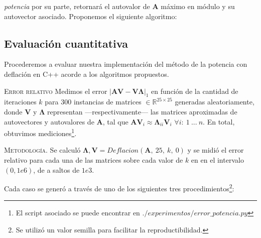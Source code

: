 \vspace{2em}
\noindent \textit{potencia} por su parte, retornará el autovalor de \textbf{A} máximo en módulo y su autovector asociado. Proponemos el siguiente algoritmo:

\vspace{1em}


\vspace{1em}






\vspace{2em}
\subsection{Evaluación cuantitativa} Procederemos a evaluar nuestra implementación del método de la potencia con deflación en C++ acorde a los algoritmos propuestos.

\vspace{1em}
\textsc{Error relativo} Medimos el error $|\mathbf{A} \mathbf{V} - \mathbf{V} \mathbf{\Lambda}|_1$ en función de la cantidad de iteraciones $k$ para 300 instancias de matrices $\in \mathbb{R}^{25 \times 25}$ generadas aleatoriamente, donde \textbf{V} y $\mathbf{\Lambda}$ representan ---respectivamente--- las matrices aproximadas de autovectores y autovalores de \textbf{A}, tal que $\mathbf{A}\mathbf{V}_i \approx \mathbf{\Lambda}_{ii} \mathbf{V}_i$ $\forall i:\ 1\ ...\ n$.  En total, obtuvimos  mediciones\footnote{El script asociado se puede encontrar en $./experimentos/error\_potencia.py$}.  


\vspace{1em}
\noindent \textsc{Metodología}. Se calculó  $\mathbf{\Lambda}, \mathbf{V} = Deflacion(\mathbf{A},\ 25,\ k,\ 0)$ y se midió el error relativo para cada una de las matrices sobre cada valor de $k$ en en el intervalo $(0, 1e6)$, de a saltos de $1e3$.

\vspace{1em}
\noindent Cada caso se generó a través de uno de los siguientes tres procedimientos\footnote{Se utilizó un valor semilla para facilitar la reproductibilidad.}:

